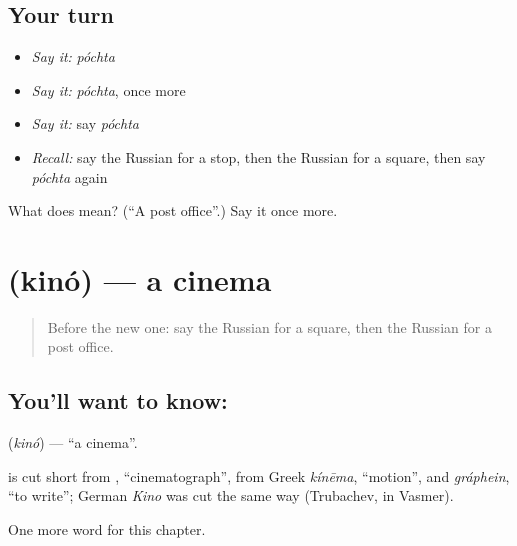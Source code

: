 \subsection*{Your turn}
\begin{itemize}
\raggedright
  \item \emph{Say it:} \emph{póchta}
  \item \emph{Say it:} \emph{póchta}, once more
  \item \emph{Say it:} say \emph{póchta}
  \item \emph{Recall:} say the Russian for a stop, then the Russian for a square, then say \emph{póchta} again
\end{itemize}

\begin{tcolorbox}[breakable,colback=teal!4,colframe=teal!35!black,title={Before you move on}]
What does  mean? (\textquotedblleft{}A post office\textquotedblright{}.) Say it once more.
\end{tcolorbox}
\section[\texorpdfstring{\ru{кино} (kinó)}{кино (kinó)}]{ (kinó) — a cinema}

\label{lesson:RU-C88-cinema}



\begin{quote}
Before the new one: say the Russian for a square, then the Russian for a post office.
\end{quote}

\subsection*{You'll want to know: }
\textbf{} (\emph{kinó}) — \textquotedblleft{}a cinema\textquotedblright{}.

\begin{cousinweb}
\textbf{} is cut short from \emph{}, \textquotedblleft{}cinematograph\textquotedblright{}, from Greek \emph{kínēma}, \textquotedblleft{}motion\textquotedblright{}, and \emph{gráphein}, \textquotedblleft{}to write\textquotedblright{}; German \emph{Kino} was cut the same way (Trubachev, in Vasmer).
\end{cousinweb}

\begin{grammarlens}[title={What you've built}]
One more word for this chapter.
\end{grammarlens}

